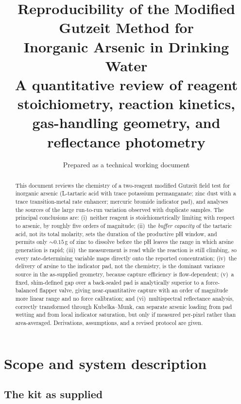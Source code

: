 \documentclass[11pt,a4paper]{article}
\title{Reproducibility of the Modified Gutzeit Method for\\
Inorganic Arsenic in Drinking Water\\
\large A quantitative review of reagent stoichiometry, reaction kinetics,\\
gas-handling geometry, and reflectance photometry}
\author{Prepared as a technical working document}
\date{}
\begin{document}
\maketitle

\begin{abstract}
\noindent
This document reviews the chemistry of a two-reagent modified Gutzeit field
test for inorganic arsenic (L-tartaric acid with trace potassium permanganate;
zinc dust with a trace transition-metal rate enhancer; mercuric bromide
indicator pad), and analyses the sources of the large run-to-run variation
observed with duplicate samples. The principal conclusions are:
(i)~neither reagent is stoichiometrically limiting with respect to arsenic,
by roughly five orders of magnitude;
(ii)~the \emph{buffer capacity} of the tartaric acid, not its total molarity,
sets the duration of the productive pH window, and permits only
$\sim\!0.15\,$g of zinc to dissolve before the pH leaves the range in which
arsine generation is rapid;
(iii)~the measurement is read while the reaction is still climbing, so every
rate-determining variable maps directly onto the reported concentration;
(iv)~the delivery of arsine to the indicator pad, not the chemistry, is the
dominant variance source in the as-supplied geometry, because capture
efficiency is flow-dependent;
(v)~a fixed, shim-defined gap over a back-sealed pad is analytically superior
to a force-balanced flapper valve, giving near-quantitative capture with an
order of magnitude more linear range and no force calibration; and
(vi)~multispectral reflectance analysis, correctly transformed through
Kubelka--Munk, can separate arsenic loading from pad wetting and from local
indicator saturation, but only if measured per-pixel rather than
area-averaged.
Derivations, assumptions, and a revised protocol are given.
\end{abstract}

\tableofcontents

\newpage

\section{Scope and system description}

\subsection{The kit as supplied}
\end{document}
